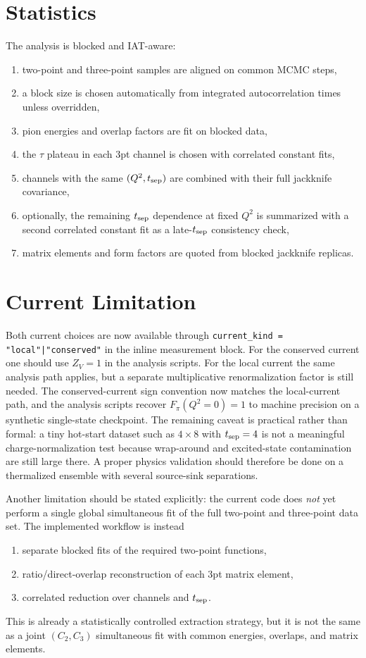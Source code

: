\documentclass[11pt]{article}
\begin{document}
\section{Statistics}
The analysis is blocked and IAT-aware:
\begin{enumerate}
  \item two-point and three-point samples are aligned on common MCMC steps,
  \item a block size is chosen automatically from integrated autocorrelation
  times unless overridden,
  \item pion energies and overlap factors are fit on blocked data,
  \item the $\tau$ plateau in each 3pt channel is chosen with correlated
  constant fits,
  \item channels with the same $(Q^2,t_{\rm sep})$ are combined with their full
  jackknife covariance,
  \item optionally, the remaining $t_{\rm sep}$ dependence at fixed $Q^2$ is
  summarized with a second correlated constant fit as a late-$t_{\rm sep}$
  consistency check,
  \item matrix elements and form factors are quoted from blocked jackknife
  replicas.
\end{enumerate}

\section{Current Limitation}
Both current choices are now available through
\texttt{current\_kind = "local"|"conserved"} in the inline measurement block.
For the conserved current one should use $Z_V=1$ in the analysis scripts. For
the local current the same analysis path applies, but a separate multiplicative
renormalization factor is still needed. The conserved-current sign convention
now matches the local-current path, and the analysis scripts recover
$F_\pi(Q^2=0)=1$ to machine precision on a synthetic single-state checkpoint.
The remaining caveat is practical rather than formal: a tiny hot-start dataset
such as $4\times 8$ with $t_{\rm sep}=4$ is not a meaningful charge-normalization
test because wrap-around and excited-state contamination are still large there.
A proper physics validation should therefore be done on a thermalized ensemble
with several source-sink separations.

Another limitation should be stated explicitly: the current code does
\emph{not} yet perform a single global simultaneous fit of the full two-point
and three-point data set. The implemented workflow is instead
\begin{enumerate}
  \item separate blocked fits of the required two-point functions,
  \item ratio/direct-overlap reconstruction of each 3pt matrix element,
  \item correlated reduction over channels and $t_{\rm sep}$.
\end{enumerate}
This is already a statistically controlled extraction strategy, but it is not
the same as a joint $(C_2,C_3)$ simultaneous fit with common energies,
overlaps, and matrix elements.
\end{document}
